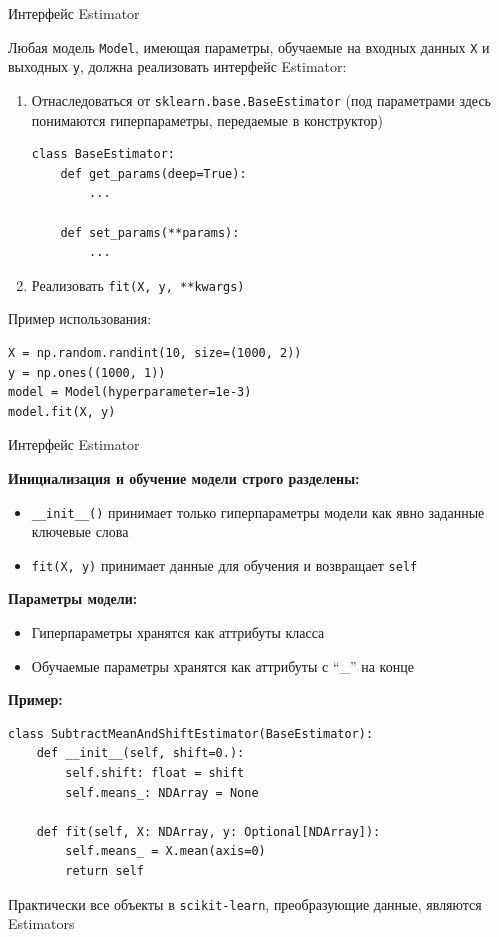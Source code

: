 \documentclass{beamer}
\begin{document}
\begin{frame}[fragile]{Интерфейс Estimator}
    \footnotesize

    Любая модель \texttt{Model}, имеющая параметры, обучаемые на входных данных \texttt{X} и выходных \texttt{y}, должна реализовать интерфейс Estimator:
    \begin{enumerate}
        \item Отнаследоваться от \texttt{sklearn.base.BaseEstimator} (под параметрами здесь понимаются гиперпараметры, передаемые в конструктор)
        \begin{lstlisting}
class BaseEstimator:
    def get_params(deep=True):
        ...

    def set_params(**params):
        ...\end{lstlisting}    
        \item Реализовать \texttt{fit(X, y, **kwargs)}
    \end{enumerate}

    Пример использования:
    \begin{lstlisting}
X = np.random.randint(10, size=(1000, 2))
y = np.ones((1000, 1))
model = Model(hyperparameter=1e-3)
model.fit(X, y)\end{lstlisting}
        
\end{frame}

\begin{frame}[fragile]{Интерфейс Estimator}
    \footnotesize
    
    \textbf{Инициализация и обучение модели строго разделены:}
    \begin{itemize}
        \item \texttt{\_\_init\_\_()} принимает только гиперпараметры модели как явно заданные ключевые слова
        \item \texttt{fit(X, y)} принимает данные для обучения и возвращает \texttt{self}
    \end{itemize}

    \textbf{Параметры модели:}
    \begin{itemize}
        \item Гиперпараметры хранятся как аттрибуты класса
        \item Обучаемые параметры хранятся как аттрибуты с ``\_'' на конце
    \end{itemize}

    \textbf{Пример:}
    \begin{lstlisting}
class SubtractMeanAndShiftEstimator(BaseEstimator):
    def __init__(self, shift=0.):
        self.shift: float = shift
        self.means_: NDArray = None

    def fit(self, X: NDArray, y: Optional[NDArray]):
        self.means_ = X.mean(axis=0)
        return self\end{lstlisting}

    Практически все объекты в \texttt{scikit-learn}, преобразующие данные, являются Estimators
\end{frame}
\end{document}
